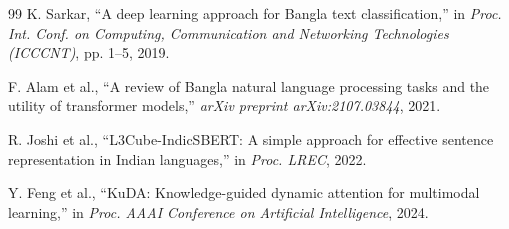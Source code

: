 \documentclass[conference]{IEEEtran}
\begin{document}
\begin{thebibliography}{99}
K. Sarkar, ``A deep learning approach for Bangla text classification,'' in \textit{Proc. Int. Conf. on Computing, Communication and Networking Technologies (ICCCNT)}, pp. 1--5, 2019.

F. Alam et al., ``A review of Bangla natural language processing tasks and the utility of transformer models,'' \textit{arXiv preprint arXiv:2107.03844}, 2021.

R. Joshi et al., ``L3Cube-IndicSBERT: A simple approach for effective sentence representation in Indian languages,'' in \textit{Proc. LREC}, 2022.

Y. Feng et al., ``KuDA: Knowledge-guided dynamic attention for multimodal learning,'' in \textit{Proc. AAAI Conference on Artificial Intelligence}, 2024.

\end{thebibliography}
\end{document}
